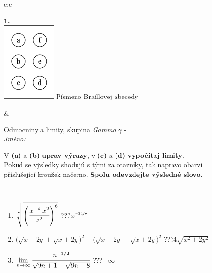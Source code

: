 \documentclass[10pt]{report}
\begin{document}
\begin{tabular}{c:c}
\begin{minipage}[c][104.5mm][t]{0.5\linewidth}
\begin{center}
\begin{minipage}{0.20\linewidth}
\begin{center}
{\Huge\bfseries 1.} \\[2mm]
\includegraphics[height=40mm]{../images/braille.png}
{\small Písmeno Braillovej abecedy}
\end{center}
\end{minipage}
\end{center}
\end{minipage}
&
\begin{minipage}[c][104.5mm][t]{0.5\linewidth}
\begin{center}
\vspace{7mm}
{\huge Odmocniny a limity, skupina \textit{Gamma $\gamma$} -}\\[5mm]
\textit{Jméno:}\phantom{xxxxxxxxxxxxxxxxxxxxxxxxxxxxxxxxxxxxxxxxxxxxxxxxxxxxxxxxxxxxxxxxx}\\[5mm]
\begin{minipage}{0.95\linewidth}
\begin{center}
V \textbf{(a)} a \textbf{(b)} \textbf{uprav výrazy}, v \textbf{(c)} a \textbf{(d)} \textbf{vypočítaj limity}.\\Pokud se výsledky shodujú s tými za otazníky, tak napravo obarvi\\příslušející kroužek načerno. \textbf{Spolu odevzdejte výsledné slovo}.
\end{center}
\end{minipage}
\\[1mm]
\begin{minipage}{0.79\linewidth}
\begin{center}
\begin{varwidth}{\linewidth}
\begin{enumerate}
\small
\item $\sqrt[7]{\left(\cfrac{x^{-4}\;x^{2}}{x^{2}}\right)^{6}}$\quad \dotfill\; ???\;\dotfill \quad $x^{\nicefrac{-24}{7}}$
\item {\footnotesize{\scriptsize$\big(\sqrt{x-2y}+\sqrt{x+2y}\big)^2-\big(\sqrt{x-2y}-\sqrt{x+2y}\big)^2$}\quad \dotfill\; ???\;\dotfill \quad $4\sqrt{x^2+2y^2}$}
\item $\lim\limits_{n\to\infty}\cfrac{n^{-1/2}}{\sqrt{9n+1}-\sqrt{9n-8}}$\quad \dotfill\; ???\;\dotfill \quad $-\infty$

\end{enumerate}
\end{varwidth}
\end{center}
\end{minipage}
\end{center}
\end{minipage}
\end{tabular}
\end{document}
